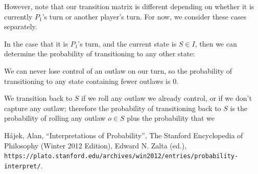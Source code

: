 \documentclass{article}
\theoremstyle{definition}
\theoremstyle{plain}
\begin{document}
	However, note that our transition matrix is different depending on whether it is currently $P_1$'s turn or another player's turn. For now, we consider these cases separately.

	In the case that it is $P_1$'s turn, and the current state is $S \in I$, then we can determine the probability of transitioning to any other state:

	We can never lose control of an outlaw on our turn, so the probability of transitioning to any state containing fewer outlaws is 0.

	We transition back to $S$ if we roll any outlaw we already control, or if we don't capture any outlaw; therefore the probability of transitioning back to $S$ is the probability of rolling any outlaw $o \in S$ plus the probability that we 

	
	
	\begin{thebibliography}{9}
		H\'{a}jek, Alan, ``Interpretations of Probability'', The Stanford Encyclopedia of Philosophy (Winter 2012 Edition), Edward N. Zalta (ed.), \texttt{https://plato.stanford.edu/archives/win2012/entries/probability-interpret/}.
	\end{thebibliography}
\end{document}

